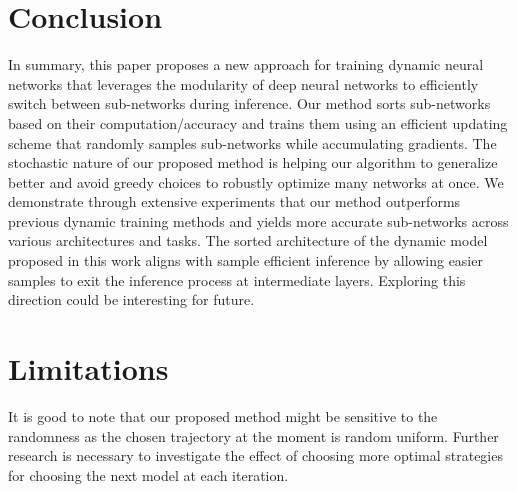 \documentclass[letterpaper]{article} %
\begin{document}
\section*{Conclusion}
In summary, this paper proposes a new approach for training dynamic neural networks that leverages the modularity of deep neural networks to efficiently switch between sub-networks during inference. Our method sorts sub-networks based on their computation/accuracy and trains them using an efficient updating scheme that randomly samples sub-networks while accumulating gradients. The stochastic nature of our proposed method is helping our algorithm to generalize better and avoid greedy choices to robustly optimize many networks at once. We demonstrate through extensive experiments that our method outperforms previous dynamic training methods and yields more accurate sub-networks across various architectures and tasks. 
The sorted architecture of the dynamic model proposed in this work aligns with sample efficient inference by allowing easier samples to exit the inference process at intermediate layers. Exploring this direction could be interesting for future. %


\section*{Limitations}
It is good to note that our proposed method might be sensitive to the randomness as the chosen trajectory at the moment is random uniform. Further research is necessary to investigate the effect of choosing more optimal strategies for choosing the next model at each iteration.






\end{document}
